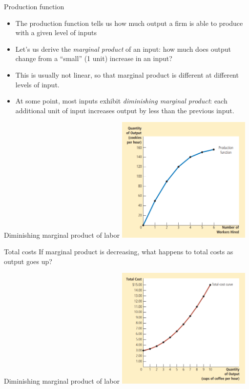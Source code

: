 \documentclass[aspectratio=169]{beamer}
\begin{document}
\begin{frame}{Production function}
    \begin{itemize}
        \item The production function tells us how much output a firm is able to produce with a given level of inputs
        \item Let's us derive the \textit{marginal product} of an input: how much does output change from a ``small'' (1 unit) increase in an input?
        \item This is usually not linear, so that marginal product is different at different levels of input.
        \item At some point, most inputs exhibit \textit{diminishing marginal product}: each additional unit of input increases output by less than the previous input.
    \end{itemize}
\end{frame}

\begin{frame}{Diminishing marginal product of labor}
    \centering
    \includegraphics[width = 0.5\textwidth,keepaspectratio]{../figs/diminishingMPL.png}
\end{frame}

\begin{frame}{Total costs}
    If marginal product is decreasing, what happens to total costs as output goes up?
\end{frame}

\begin{frame}{Diminishing marginal product of labor}
    \centering
    \includegraphics[width = 0.5\textwidth,keepaspectratio]{../figs/increasingTC.png}
\end{frame}
\end{document}
